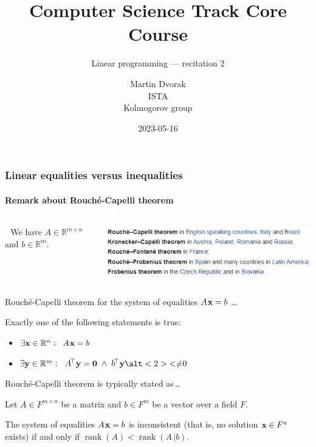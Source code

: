 \documentclass{beamer}
\title{Computer Science Track Core Course}
\subtitle{Linear programming --- recitation 2}
\author{Martin Dvorak\\ISTA\\Kolmogorov group}
\date{2023-05-16}
\renewcommand{\.}{\hskip .75pt}
\DeclareMathOperator{\aand}{~\wedge~}
\DeclareMathOperator{\rank}{rank}
\begin{document}
\begin{frame}
 	\titlepage
\end{frame}


\begin{frame}
	\frametitle{Linear equalities versus inequalities}
	\framesubtitle{Remark about Rouché-Capelli theorem}
	
	\begin{columns} 
		\begin{column}{0.55\textwidth}
			\;\;\,\, We have $A \in \mathbb{R}^{m \times n}$ and	$b \in \mathbb{R}^{m}$.
		\end{column}
	
		\begin{column}{0.5\textwidth}
			\includegraphics[width=\textwidth]{Rouche_wiki}
		\end{column}
	\end{columns}
	
	
	\smallskip
	
	{ \color{dred}
		Rouché-Capelli theorem for the system of equalities $A\. \bold{x} = b$ \dots
		
		Exactly one of the following statements is true:
	}
	\begin{itemize} \color{dred}
		\item $\exists \bold{x} \in \mathbb{R}^{n} : \ \; A\. \bold{x} = b$
		\item $\exists \bold{y} \in \mathbb{R}^{m} : \ \; A^{\!\top} \bold{y} = \bold{0} \aand b^{\!\top} \bold{y} \alt<2>{<}{\neq} 0$
	\end{itemize}
	\bigskip
	
	Rouché-Capelli theorem is typically stated as\,\dots
	
	Let $A \in F^{m \times n}$ be a matrix and $b \in F^{m}$ be a vector over a field $F$.
	
	The system of equalities $A\. \bold{x} = b$ is \textcolor{dgreen}{inconsistent} (that is, no solution $\bold{x} \in F^{n}$ exists) \textcolor{dgreen}{if and only if} $\rank(A) < \rank(A\,|b)$.

\end{frame}
\end{document}
